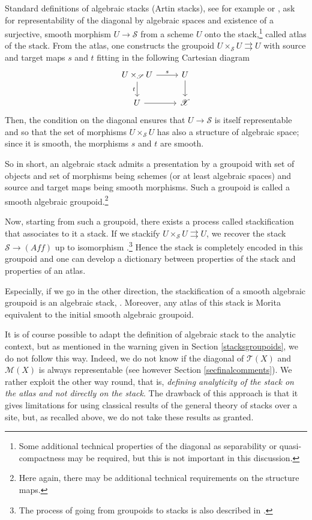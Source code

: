 \documentclass[JEP,XML,SOM,Unicode]{cedram}
\let\mathcal\mathscr
\newcommand{\Aff}{\mathit{Aff}}
\theoremstyle{plain}
\theoremstyle{definition}
\theoremstyle{remark}
\numberwithin{equation}{section}
\newcommand{\T}{\mathcal T(X)}
\begin{document}
Standard definitions of algebraic stacks (Artin stacks), see for example \cite[Def.\,86.12.1]{Stacksproject} or \cite[Def.\,15.9]{BCEFFGK}, ask for representability of the diagonal by algebraic spaces and existence of a surjective, smooth morphism $U\to\mathcal S$ from a scheme $U$ onto the stack,\footnote{Some additional technical properties of the diagonal as separability or quasi-compactness may be required, but this is not important in this discussion.} called atlas of the stack. From the atlas, one constructs the groupoid $U\times_{\mathcal S}U\rightrightarrows U$ with source and target maps $s$ and $t$ fitting in the following Cartesian diagram
\begin{equation}
\label{symgroup}
\begin{tikzcd}
U\times_{\mathcal S}U \arrow[d,"t"']\arrow[r,"s"]&U\arrow[d]\\
U \arrow[r]&\mathcal X
\end{tikzcd}
\end{equation}
Then, the condition on the diagonal ensures that $U\to\mathcal S$ is itself representable and so that the set of morphisms $U\times_{\mathcal S}U$ has also a structure of algebraic space; since it is smooth, the morphisms $s$ and $t$ are smooth.

So in short, an algebraic stack admits a presentation by a groupoid with set of \hbox{objects} and set of morphisms being schemes (or at least algebraic spaces) and source and target maps being smooth morphisms. Such a groupoid is called a smooth algebraic groupoid.\footnote{Here again, there may be additional technical requirements on the structure maps.}

Now, starting from such a groupoid, there exists a process called stackification that associates to it a stack. If we stackify $U\times_{\mathcal S}U\rightrightarrows U$, we recover the stack $\mathcal S\to (\Aff)$ up to isomorphism \cite[Prop.\,15.19]{BCEFFGK}.\footnote{The process of going from groupoids to stacks is also described in \cite[\S 3.4.3]{LMB}.} Hence the stack is completely encoded in this groupoid and one can develop a dictionary between properties of the stack and properties of an atlas.

Especially, if we go in the other direction, the stackification of a smooth algebraic groupoid is an algebraic stack, \cite[Prop.\,15.18]{BCEFFGK}. Moreover, any atlas of this stack is Morita equivalent to the initial smooth algebraic groupoid.

It is of course possible to adapt the definition of algebraic stack to the analytic context, but as mentioned in the warning given in Section \ref{stacksgroupoids}, we do not follow this way. Indeed, we do not know if the diagonal of $\T$ and $\mathcal M(X)$ is always representable (see however Section \ref{secfinalcomments}). We rather exploit the other way round, that is, \emph{defining analyticity of the stack on the atlas and not directly on the stack}. The drawback of this approach is that it gives limitations for using classical results of the general theory of stacks over a site, but, as recalled above, we do not take these results as granted.
\end{document}
